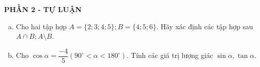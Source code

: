 \begin{center}
	\textbf{PHẦN 2 - TỰ LUẬN}
\end{center}

\begin{bt}%
	\begin{enumerate}[a)]
		\item Cho hai tập hợp $A=\{2;3;4;5\} ; B=\{4;5;6\}$. Hãy xác định các tập hợp sau $A \cap B ; A \setminus B$.
		\item Cho $\cos \alpha=\dfrac{-4}{5}\left(90^{\circ}<\alpha<180^{\circ}\right)$. Tính các giá trị lượng giác $\sin \alpha, \tan \alpha$.
	\end{enumerate}
\end{bt}
